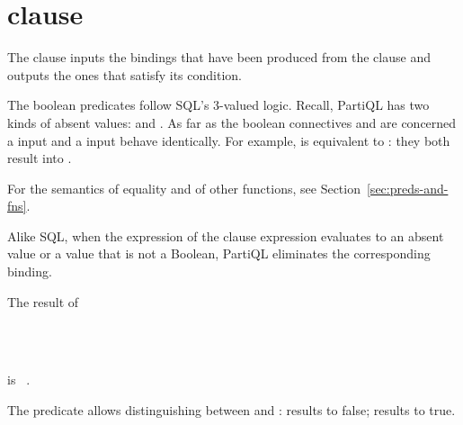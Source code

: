 \section{ clause}
\label{sec:where}
 
The  clause inputs the bindings that have been produced from the
 clause and outputs the ones that satisfy its condition.

The boolean predicates follow SQL's 3-valued logic. Recall, PartiQL has two
kinds of absent values:  and . As far as the boolean
connectives and  are concerned a  input and a 
input behave identically. For example,  is equivalent to
: they both result into .

For the semantics of equality and of other functions, see
Section~\ref{sec:preds-and-fns}.

Alike SQL, when the expression of the  clause expression evaluates to
an absent value or a value that is not a Boolean, PartiQL eliminates the
corresponding binding. 

\begin{example} The result of
\begin{tabbing}
\\
\\
\end{tabbing}
\noindent is \texttt{ \cb}.
\end{example}

The predicate  allows distinguishing between  and
:  results to false; 
results to true.

